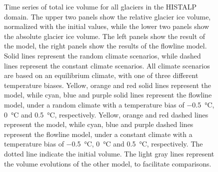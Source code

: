 \begin{figure}[htp]
          \caption{Time series of total ice volume for all glaciers in the HISTALP domain. The upper two panels show the relative glacier ice volume, normalized with the initial values, while the lower two panels show the absolute glacier ice volume. The left panels show the result of the \vas{} model, the right panels show the results of the flowline model. Solid lines represent the random climate scenarios, while dashed lines represent the constant climate scenarios. All climate scenarios are based on an equilibrium climate, with one of three different temperature biases.
          Yellow, orange and red solid lines represent the \vas{} model, while cyan, blue and purple solid lines represent the flowline model, under a random climate with a temperature bias of \SI{-.5}{\celsius}, \SI{0}{\celsius} and \SI{+.5}{\celsius}, respectively. Yellow, orange and red dashed lines represent the \vas{} model, while cyan, blue and purple dashed lines represent the flowline model, under a constant climate with a temperature bias of \SI{-.5}{\celsius}, \SI{0}{\celsius} and \SI{+.5}{\celsius}, respectively. %
          The dotted line indicate the initial volume. The light gray lines represent the volume evolutions of the other model, to facilitate comparisons.}
          \label{fig:histalp_commitment}
        \end{figure}

          

